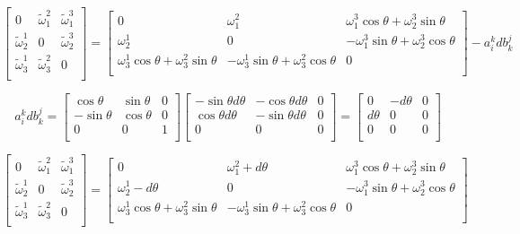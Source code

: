 \documentclass[12pt,a4paper]{article}
\begin{document}
\[
\left[
\begin{array}{ccc}
0 & \tilde{\omega}^2_1 & \tilde{\omega}^3_1 \\
\tilde{\omega}^1_2 & 0 & \tilde{\omega}^3_2 \\
\tilde{\omega}^1_3 & \tilde{\omega}^2_3 & 0 \\
\end{array}
\right]  = 
\left[
\begin{array}{ccc}
0 & \omega^2_1 & \omega^3_1\cos\theta+\omega^3_2\sin\theta \\
\omega^1_2 & 0 & -\omega^3_1\sin\theta+\omega^3_2\cos\theta  \\
\omega^1_3\cos\theta+\omega^2_3\sin\theta  &  -\omega^1_3\sin\theta+\omega^2_3\cos\theta & 0 \\
\end{array}
\right] - a^k_idb^j_k
\]

\[
a^k_idb^j_k = \left[
\begin{array}{ccc}
\cos\theta & \sin\theta & 0 \\
-\sin\theta & \cos\theta & 0 \\
0 & 0 & 1 \\
\end{array}
\right]\left[
\begin{array}{ccc}
-\sin\theta d\theta & -\cos\theta d\theta  & 0 \\
\cos\theta d\theta  & -\sin\theta d\theta  & 0 \\
0 & 0 & 0 \\
\end{array}
\right]=\left[
\begin{array}{ccc}
0 & -d\theta  & 0 \\
d\theta  & 0  & 0 \\
0 & 0 & 0 \\
\end{array}
\right]
\]


\[
\left[
\begin{array}{ccc}
0 & \tilde{\omega}^2_1 & \tilde{\omega}^3_1 \\
\tilde{\omega}^1_2 & 0 & \tilde{\omega}^3_2 \\
\tilde{\omega}^1_3 & \tilde{\omega}^2_3 & 0 \\
\end{array}
\right]  = 
\left[
\begin{array}{ccc}
0 & \omega^2_1 + d\theta& \omega^3_1\cos\theta+\omega^3_2\sin\theta \\
\omega^1_2 - d\theta & 0 & -\omega^3_1\sin\theta+\omega^3_2\cos\theta  \\
\omega^1_3\cos\theta+\omega^2_3\sin\theta  &  -\omega^1_3\sin\theta+\omega^2_3\cos\theta & 0 \\
\end{array}
\right]
\]
\end{document}
